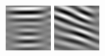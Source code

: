 \begin{figure}[ht]
\begin{center}
  \includegraphics[width=\columnwidth/9]{ch4/figures/real_3_4.jpg}
  \includegraphics[width=\columnwidth/9]{ch4/figures/real_3_5.jpg}

\end{center}
\end{figure}

